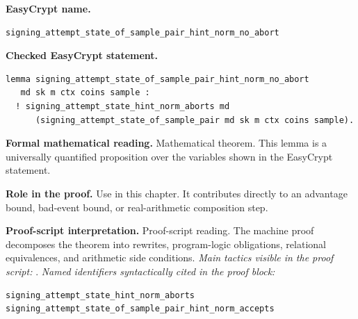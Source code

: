 \begin{formaltheorem}
\noindent\textbf{EasyCrypt name.}
\begin{lstlisting}[language=EasyCrypt,basicstyle=\ttfamily\scriptsize]
signing_attempt_state_of_sample_pair_hint_norm_no_abort
\end{lstlisting}
\noindent\textbf{Checked EasyCrypt statement.}
\begin{lstlisting}[language=EasyCrypt,basicstyle=\ttfamily\scriptsize]
lemma signing_attempt_state_of_sample_pair_hint_norm_no_abort
   md sk m ctx coins sample :
  ! signing_attempt_state_hint_norm_aborts md
      (signing_attempt_state_of_sample_pair md sk m ctx coins sample).
\end{lstlisting}
\noindent\textbf{Formal mathematical reading.}
Mathematical theorem. This lemma is a universally quantified proposition over the variables shown in the EasyCrypt statement.

\noindent\textbf{Role in the proof.}
Use in this chapter. It contributes directly to an advantage bound, bad-event bound, or real-arithmetic composition step.

\noindent\textbf{Proof-script interpretation.}
Proof-script reading. The machine proof decomposes the theorem into rewrites, program-logic obligations, relational equivalences, and arithmetic side conditions.
\emph{Main tactics visible in the proof script:} .
\emph{Named identifiers syntactically cited in the proof block:}
\begin{lstlisting}[language=EasyCrypt,basicstyle=\ttfamily\scriptsize]
signing_attempt_state_hint_norm_aborts
signing_attempt_state_of_sample_pair_hint_norm_accepts
\end{lstlisting}

\end{formaltheorem}

